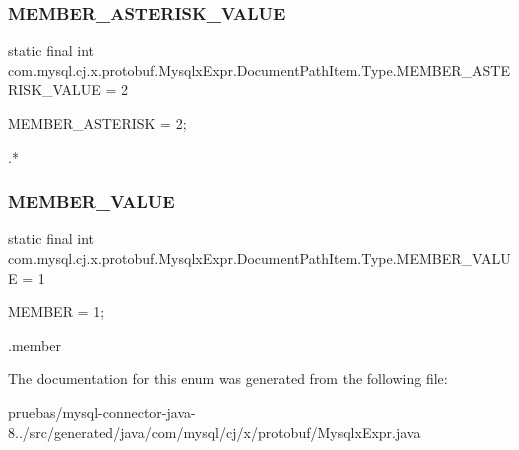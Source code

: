\subsubsection{\texorpdfstring{M\+E\+M\+B\+E\+R\+\_\+\+A\+S\+T\+E\+R\+I\+S\+K\+\_\+\+V\+A\+L\+UE}{MEMBER\_ASTERISK\_VALUE}}
{\footnotesize\ttfamily  static  final int com.\+mysql.\+cj.\+x.\+protobuf.\+Mysqlx\+Expr.\+Document\+Path\+Item.\+Type.\+M\+E\+M\+B\+E\+R\+\_\+\+A\+S\+T\+E\+R\+I\+S\+K\+\_\+\+V\+A\+L\+UE = 2\hspace{0.3cm}{\ttfamily [static]}}

{\ttfamily M\+E\+M\+B\+E\+R\+\_\+\+A\+S\+T\+E\+R\+I\+SK = 2;}


\begin{DoxyPre}
.*
\end{DoxyPre}
 \mbox{\label{enumcom_1_1mysql_1_1cj_1_1x_1_1protobuf_1_1_mysqlx_expr_1_1_document_path_item_1_1_type_ae83251ee3879d461332876c26a39cb2d}} 
\subsubsection{\texorpdfstring{M\+E\+M\+B\+E\+R\+\_\+\+V\+A\+L\+UE}{MEMBER\_VALUE}}
{\footnotesize\ttfamily  static  final int com.\+mysql.\+cj.\+x.\+protobuf.\+Mysqlx\+Expr.\+Document\+Path\+Item.\+Type.\+M\+E\+M\+B\+E\+R\+\_\+\+V\+A\+L\+UE = 1\hspace{0.3cm}{\ttfamily [static]}}

{\ttfamily M\+E\+M\+B\+ER = 1;}


\begin{DoxyPre}
.member
\end{DoxyPre}
 

The documentation for this enum was generated from the following file\+:\begin{DoxyCompactItemize}
\item 
pruebas/mysql-\/connector-\/java-\/8../src/generated/java/com/mysql/cj/x/protobuf/Mysqlx\+Expr.\+java\end{DoxyCompactItemize}
